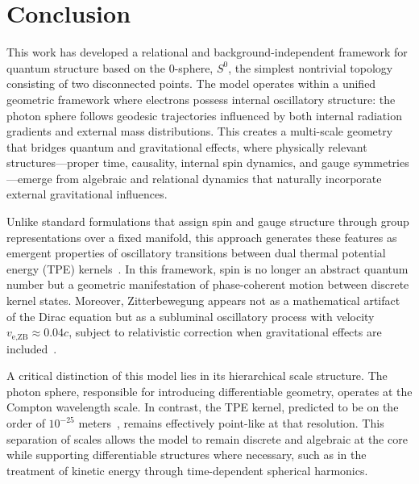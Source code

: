 \documentclass[%
 reprint,
 amsmath,amssymb,
 aps,
]{revtex4-1}
\numberwithin{equation}{section}%
\begin{document}
\section{Conclusion}
\label{sec:conclusion}

This work has developed a relational and background-independent framework for quantum structure based on the 0-sphere, $S^0$, the simplest nontrivial topology consisting of two disconnected points. The model operates within a unified geometric framework where electrons possess internal oscillatory structure: the photon sphere follows geodesic trajectories influenced by both internal radiation gradients and external mass distributions. This creates a multi-scale geometry that bridges quantum and gravitational effects, where physically relevant structures—proper time, causality, internal spin dynamics, and gauge symmetries—emerge from algebraic and relational dynamics that naturally incorporate external gravitational influences.

Unlike standard formulations that assign spin and gauge structure through group representations over a fixed manifold, this approach generates these features as emergent properties of oscillatory transitions between dual thermal potential energy (TPE) kernels~\cite{hanamura2309.0047}. In this framework, spin is no longer an abstract quantum number but a geometric manifestation of phase-coherent motion between discrete kernel states. Moreover, Zitterbewegung appears not as a mathematical artifact of the Dirac equation but as a subluminal oscillatory process with velocity $v_{\text{e,ZB}} \approx 0.04c$, subject to relativistic correction when gravitational effects are included~\cite{hanamura2501.0130}.

A critical distinction of this model lies in its hierarchical scale structure. The photon sphere, responsible for introducing differentiable geometry, operates at the Compton wavelength scale. In contrast, the TPE kernel, predicted to be on the order of $10^{-25}$ meters~\cite{hanamura2501.0130}, remains effectively point-like at that resolution. This separation of scales allows the model to remain discrete and algebraic at the core while supporting differentiable structures where necessary, such as in the treatment of kinetic energy through time-dependent spherical harmonics.
\end{document}
